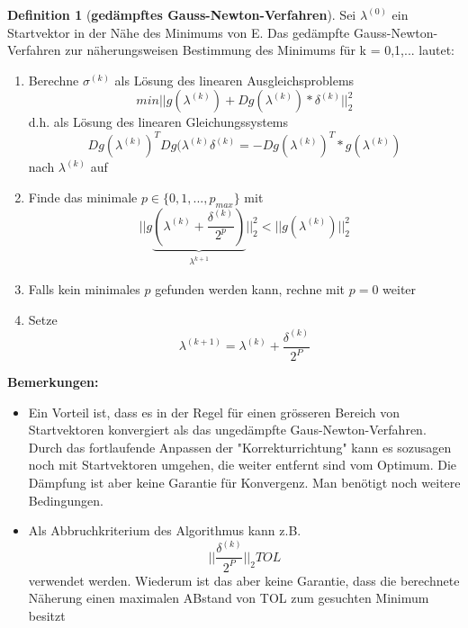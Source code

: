 \documentclass{article}
\theoremstyle{satz}
\theoremstyle{definition}
\newtheorem{definition}{Definition}
\begin{document}
\theoremstyle{definition}
\begin{tcolorbox}
\begin{definition}[\textbf{gedämpftes Gauss-Newton-Verfahren}]
Sei \textbf{$\lambda^{(0)}$} ein Startvektor in der Nähe des Minimums von E. Das gedämpfte Gauss-Newton-Verfahren zur näherungsweisen Bestimmung des Minimums für k = 0,1,... lautet:
\begin{enumerate}
	\item {Berechne $\sigma^{(k)}$ als Lösung des linearen Ausgleichsproblems
	\begin{equation}
		min || g(\lambda^{(k)}) + Dg(\lambda^{(k)})*\delta^{(k)}||^2_2
	\end{equation}
	d.h. als Lösung des linearen Gleichungssystems
	\begin{equation}
		Dg(\lambda^{(k)})^T Dg(\lambda^{(k)} \delta^{(k)} = -Dg(\lambda^{(k)})^T * g(\lambda^{(k)})
	\end{equation}
	nach $\lambda^{(k)}$ auf
	}
	\item { Finde das minimale $p \in \{0, 1, ..., p_{max}\}$ mit
	\begin{equation}
		||g \underbrace{(\lambda^{(k)} + \frac{\delta^{(k)}}{2^p})}_{\substack{\lambda^{k+1}}} ||^2_2 < || g(\lambda^{(k)})||^2_2
	\end{equation}
	}
	\item Falls kein minimales $p$ gefunden werden kann, rechne mit $p=0$ weiter
	\item {Setze
	\begin{equation}
		\lambda^{(k+1)} = \lambda^{(k)} + \frac{\delta^{(k)}}{2^P}
	\end{equation}
	}
\end{enumerate}
\textbf{Bemerkungen: }\\
\begin{itemize}
	\item Ein Vorteil ist, dass es in der Regel für einen grösseren Bereich von Startvektoren konvergiert als das ungedämpfte Gaus-Newton-Verfahren. Durch das fortlaufende Anpassen der "Korrekturrichtung" kann es sozusagen noch mit Startvektoren umgehen, die weiter entfernt sind vom Optimum. Die Dämpfung ist aber keine Garantie für Konvergenz. Man benötigt noch weitere Bedingungen. 
	\item {Als Abbruchkriterium des Algorithmus kann z.B. 
	\begin{equation}
		|| \frac{\delta^{(k)}}{2^P}||_2 TOL
	\end{equation}
	verwendet werden. Wiederum ist das aber keine Garantie, dass die berechnete Näherung einen maximalen ABstand von TOL zum gesuchten Minimum besitzt
	}
\end{itemize}
\end{definition}
\end{tcolorbox}
\end{document}
